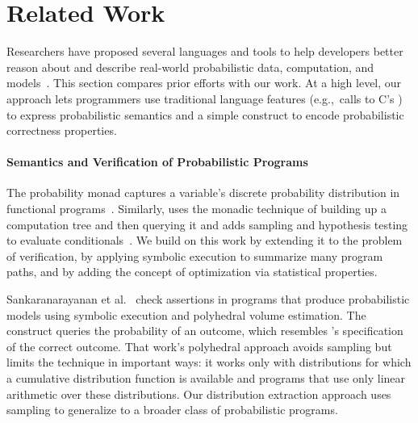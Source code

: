\section{Related Work}

Researchers have proposed several languages and tools to
help developers better reason about and describe real-world
probabilistic data, computation, and models~\cite{BBGR13,
  wingate-lightweight, church, chaganty, pfeffersample, pmonad,
  infernet, probdsl,uncertaint}.
This section compares prior efforts with our work.
At a high level, our approach lets programmers use traditional language
features (e.g.,~calls
to C's ) to express probabilistic semantics and a simple
construct to encode probabilistic correctness properties.

\paragraph{Semantics and Verification of Probabilistic Programs}
The probability monad captures a variable's discrete probability
distribution in functional programs~\cite{pmonad}.
Similarly,  uses the monadic technique of
building up a computation tree and then querying it and adds sampling and
hypothesis testing to evaluate conditionals~\cite{uncertaint}.
We build on this work by extending it to the problem of
verification, by applying symbolic execution to summarize many
program paths, and by adding the concept of optimization via
statistical properties.

Sankaranarayanan et al.~\cite{sriram-pldi} check assertions in
programs that produce probabilistic models using symbolic execution
and polyhedral volume estimation. The  construct
queries the probability of an outcome, which resembles \passert's
specification of the correct outcome.
That work's polyhedral approach avoids sampling but limits the technique in
important ways: it works only with
distributions for which a cumulative distribution function is available
and programs that use only linear arithmetic over these distributions.
Our distribution extraction approach uses sampling to generalize to a broader
class of
probabilistic programs.


